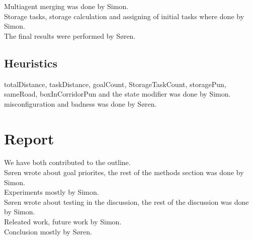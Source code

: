 \documentclass{article}
\begin{document}
Multiagent merging was done by Simon.\\

Storage tasks, storage calculation  and assigning of initial tasks where done by Simon.\\

The final results were performed by Søren.

\subsection{Heuristics}
totalDistance, taskDistance, goalCount, StorageTaskCount, storagePun, sameRoad, boxInCorridorPun
and the state modifier was done by Simon.\\

misconfiguration and badness was done by Søren.

\section{Report}
We have both contributed to the outline.\\
Søren wrote about goal priorites, the rest of the methods section was done by Simon.\\

Experiments mostly by Simon.\\

Søren wrote about testing in the discussion, the rest of the discussion was done by Simon.\\

Releated work, future work by Simon.\\

Conclusion mostly by Søren.
\end{document}
